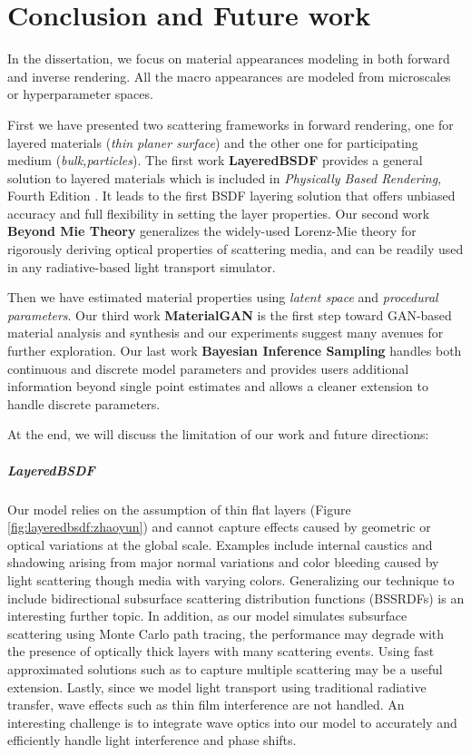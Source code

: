 \chapter{Conclusion and Future work}
\label{cpt:conclusion}

In the dissertation, we focus on material appearances modeling in both forward and inverse rendering. All the macro appearances are modeled from microscales or hyperparameter spaces. 

First we have presented two scattering frameworks in forward rendering, one for layered materials (\emph{thin planer surface}) and the other one for participating medium (\emph{bulk,particles}). The first work \textbf{LayeredBSDF} provides a general solution to layered materials which is included in \emph{Physically Based Rendering}, Fourth Edition \cite{pharr2021physically}. It leads to the first BSDF layering solution that offers unbiased accuracy and full flexibility in setting the layer properties.
Our second work \textbf{Beyond Mie Theory} generalizes the widely-used Lorenz-Mie theory for rigorously deriving optical properties of scattering media, and can be readily used in any radiative-based light transport simulator.

Then we have estimated material properties using \emph{latent space} and \emph{procedural parameters}. Our third work \textbf{MaterialGAN} is the first step toward GAN-based material analysis and synthesis and our experiments suggest many avenues for further exploration. Our last work \textbf{Bayesian Inference Sampling} handles both continuous and discrete model parameters and provides users additional information beyond single point estimates and allows a
cleaner extension to handle discrete parameters.

At the end, we will discuss the limitation of our work and future directions:

\paragraph{LayeredBSDF}
Our model relies on the assumption of thin flat layers (Figure \ref{fig:layeredbsdf:zhaoyun}) and cannot capture effects caused by geometric or optical variations at the global scale.
Examples include internal caustics and shadowing arising from major normal variations and color bleeding caused by light scattering though media with varying colors.
Generalizing our technique to include bidirectional subsurface scattering distribution functions (BSSRDFs) is an interesting further topic.
In addition, as our model simulates subsurface scattering using Monte Carlo path tracing, the performance may degrade with the presence of optically thick layers with many scattering events.
Using fast approximated solutions such as \cite{jensen2001practical,frisvad2014directional} to capture multiple scattering may be a useful extension.
Lastly, since we model light transport using traditional radiative transfer, wave effects such as thin film interference are not handled.
An interesting challenge is to integrate wave optics into our model to accurately and efficiently handle light interference and phase shifts.

